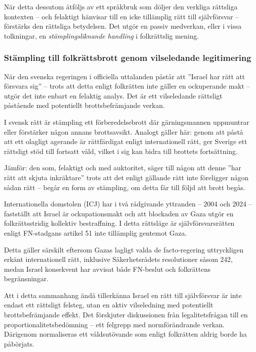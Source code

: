 När detta dessutom åtföljs av ett språkbruk som döljer den verkliga rättsliga kontexten – och felaktigt hänvisar 
till en icke tillämplig rätt till självförsvar – förstärks den rättsliga betydelsen. 
Det utgör en passiv medverkan, eller i vissa tolkningar, en \textit{stämplingsliknande handling} i folkrättslig mening.

\medskip

\subsubsection{Stämpling till folkrättsbrott genom vilseledande legitimering}

När den svenska regeringen i officiella uttalanden påstår att ”Israel har rätt att försvara sig” – trots att detta 
enligt folkrätten inte gäller en ockuperande makt – utgör det inte enbart en felaktig analys. 
Det är ett vilseledande rättsligt påstående med potentiellt brottsbefrämjande verkan.

I svensk rätt är stämpling ett förberedelsebrott där gärningsmannen uppmuntrar eller förstärker någon annans brottsavsikt. 
Analogt gäller här: genom att påstå att ett olagligt agerande är rättfärdigat enligt internationell rätt, 
ger Sverige ett rättsligt stöd till fortsatt våld, vilket i sig kan bidra till brottets fortsättning.

Jämför: den som, felaktigt och med auktoritet, säger till någon att denne ”har rätt att skjuta inkräktare” trots 
att det enligt gällande rätt inte föreligger någon sådan rätt – begår en form av stämpling, 
om detta får till följd att brott begås.

Internationella domstolen (ICJ) har i två rådgivande yttranden – 2004 och 2024 – fastställt att Israel är ockupationsmakt 
och att blockaden av Gaza utgör en folkrättsstridig kollektiv bestraffning. I detta rättsläge är 
självförsvarsrätten enligt FN-stadgans artikel 51 inte tillämplig gentemot Gaza. 

Detta gäller särskilt eftersom Gazas lagligt valda de facto-regering uttryckligen erkänt internationell rätt, inklusive 
Säkerhetsrådets resolutioner såsom 242, medan Israel konsekvent har avvisat både FN-beslut och folkrättens begränsningar.

Att i detta sammanhang ändå tillerkänna Israel en rätt till självförsvar är inte endast ett rättsligt felsteg, 
utan en aktiv vilseledning med potentiellt brottsbefrämjande effekt. Det förskjuter diskussionen från legalitetsfrågan till en proportionalitetsbedömning – ett felgrepp med normförändrande verkan.
Därigenom normaliseras ett våldsutövande som enligt folkrätten aldrig borde ha påbörjats.

